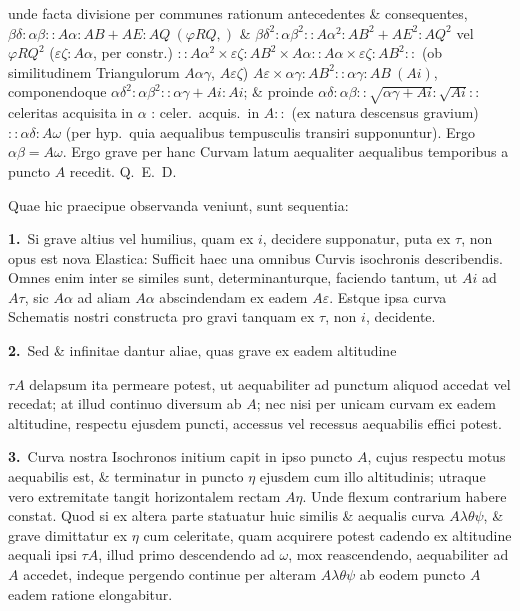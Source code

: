 \documentclass{article}
\begin{document}
unde facta divisione per communes rationum antecedentes \& consequentes,
$\beta\delta : \alpha\beta :: A\alpha : AB + AE : AQ\ (\varphi RQ,)$ \&
$\beta\delta^{2} : \alpha\beta^{2} :: A\alpha^{2} : AB^{2} + AE^{2} : AQ^{2}$ vel $\varphi RQ^{2}$
($\varepsilon\zeta : A\alpha$, per constr.)
$:: A\alpha^{2} \times \varepsilon\zeta : AB^{2} \times A\alpha ::
A\alpha \times \varepsilon\zeta : AB^{2} ::{}$ (ob similitudinem Triangulorum $A\alpha\gamma$,
$A\varepsilon\zeta$) $A\varepsilon \times \alpha\gamma : AB^{2} :: \alpha\gamma : AB\ (Ai)$,
componendoque $\alpha\delta^{2} : \alpha\beta^{2} :: \alpha\gamma + Ai : Ai$; \& proinde
$\alpha\delta : \alpha\beta :: \sqrt{\alpha\gamma + Ai} : \sqrt{Ai} ::{}$ celeritas acquisita in
$\alpha$ : celer.\ acquis.\ in $A ::{}$ (ex natura descensus gravium) $:: \alpha\delta : A\omega$ (per
hyp.\ quia aequalibus tempusculis transiri supponuntur). Ergo $\alpha\beta = A\omega$. Ergo grave
per hanc Curvam latum aequaliter aequalibus temporibus a puncto $A$ recedit. Q.~E.~D.

Quae hic praecipue observanda veniunt, sunt sequentia:

\textbf{1.}~Si grave altius vel humilius, quam ex $i$, decidere supponatur, puta ex $\tau$, non opus
est nova Elastica: Sufficit haec una omnibus Curvis isochronis describendis. Omnes enim inter se
similes sunt, determinanturque, faciendo tantum, ut $Ai$ ad $A\tau$, sic $A\alpha$ ad aliam
$A\alpha$ abscindendam ex eadem $A\varepsilon$. Estque ipsa curva Schematis nostri constructa pro
gravi tanquam ex $\tau$, non $i$, decidente.

\textbf{2.}~Sed \& infinitae dantur aliae, quas grave ex eadem altitudine

$\tau A$ delapsum ita permeare potest, ut aequabiliter ad punctum aliquod accedat vel recedat; at
illud continuo diversum ab $A$; nec nisi per unicam curvam ex eadem altitudine, respectu ejusdem
puncti, accessus vel recessus aequabilis effici potest.

\textbf{3.}~Curva nostra Isochronos initium capit in ipso puncto $A$, cujus respectu motus aequabilis
est, \& terminatur in puncto $\eta$ ejusdem cum illo altitudinis; utraque vero extremitate tangit
horizontalem rectam $A\eta$. Unde flexum contrarium habere constat. Quod si ex altera parte
statuatur huic similis \& aequalis curva $A\lambda\theta\psi$, \& grave dimittatur ex $\eta$ cum
celeritate, quam acquirere potest cadendo ex altitudine aequali ipsi $\tau A$, illud primo
descendendo ad $\omega$, mox reascendendo, aequabiliter ad $A$ accedet, indeque pergendo continue per
alteram $A\lambda\theta\psi$ ab eodem puncto $A$ eadem ratione elongabitur.
\end{document}
